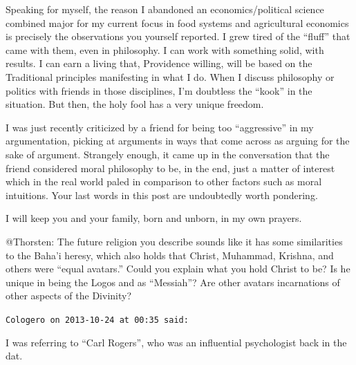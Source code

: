 \begin{footnotesize}
\begin{sffamily}
Speaking for myself, the reason I abandoned an economics/political science combined major for my current focus in food systems and agricultural economics is precisely the observations you yourself reported. I grew tired of the ``fluff'' that came with them, even in philosophy. I can work with something solid, with results. I can earn a living that, Providence willing, will be based on the Traditional principles manifesting in what I do. When I discuss philosophy or politics with friends in those disciplines, I'm doubtless the ``kook'' in the situation. But then, the holy fool has a very unique freedom.

I was just recently criticized by a friend for being too ``aggressive'' in my argumentation, picking at arguments in ways that come across as arguing for the sake of argument. Strangely enough, it came up in the conversation that the friend considered moral philosophy to be, in the end, just a matter of interest which in the real world paled in comparison to other factors such as moral intuitions. Your last words in this post are undoubtedly worth pondering.

I will keep you and your family, born and unborn, in my own prayers.

@Thorsten: The future religion you describe sounds like it has some similarities to the Baha'i heresy, which also holds that Christ, Muhammad, Krishna, and others were ``equal avatars.'' Could you explain what you hold Christ to be? Is he unique in being the Logos and as ``Messiah''? Are other avatars incarnations of other aspects of the Divinity?

\hfill

\texttt{Cologero on 2013-10-24 at 00:35 said:}

I was referring to ``Carl Rogers'', who was an influential psychologist back in the dat.

\hfill

\end{sffamily}
\end{footnotesize}

